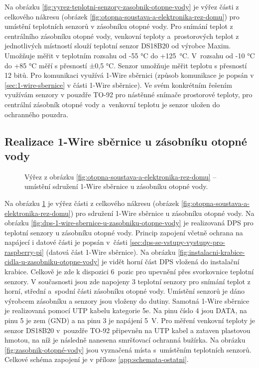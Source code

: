 Na obrázku \ref{fig:vyrez-teplotni-senzory-zasobnik-otopne-vody} je výřez části z celkového nákresu (obrázek \ref{fig:otopna-soustava-a-elektronika-rez-domu}) pro umístění teplotních senzorů v zásobníku otopné vody. Pro snímání teplot z centrálního zásobníku otopné vody, venkovní teploty a~prostorových teplot z jednotlivých místností slouží teplotní senzor DS18B20 \cite{vyrobce-ds18b20} od výrobce Maxim. Umožňuje měřit v teplotním rozsahu od -55 °C do +125~°C. V~rozsahu od -10 °C do +85 °C měří s přesností ±0,5 °C. Senzor umožňuje měřit teplotu s přesností 12 bitů. Pro komunikaci využívá 1-Wire sběrnici (způsob komunikace je popsán v \ref{sec:1-wire-sbernice} v části 1-Wire sběrnice). Ve svém konkrétním řešením využívám senzory v pouzdře TO-92 pro nástěnné snímače prostorové teploty, pro centrální zásobník otopné vody a~venkovní teplotu je senzor uložen do ochranného pouzdra.

\subsection{Realizace 1-Wire sběrnice u zásobníku otopné vody}
\begin{figure}[H]
   \centering
   \def\svgwidth{0.2\columnwidth}
   
   \caption[Výřez pro umístění sdružení 1-Wire sběrnice u zásobníku otopné vody.]{Výřez z obrázku \ref{fig:otopna-soustava-a-elektronika-rez-domu} – umístění sdružení 1-Wire sběrnice u zásobníku otopné vody.}
    \label{fig:vyrez-1-wire-sbernice-u-zasobniku-otopne-vody}
\end{figure}

Na obrázku \ref{fig:vyrez-1-wire-sbernice-u-zasobniku-otopne-vody} je výřez části z celkového nákresu (obrázek \ref{fig:otopna-soustava-a-elektronika-rez-domu}) pro sdružení 1-Wire sběrnice u zásobníku otopné vody. Na obrázku \ref{fig:dps-1-wire-sbernice-u-zasobniku-otopne-vody} je realizovaná DPS pro teplotní senzory u zásobníku otopné vody. Princip zapojení včetně ochrana na napájecí i datové části je popsán v~části \ref{sec:dps-se-vstupy-vystupy-pro-raspberry-pi} (datová část 1-Wire sběrnice). Na obrázku \ref{fig:instalacni-krabice-cidla-u-zasobniku-otopne-vody} je vidět horní část DPS vložená do instalační krabice. Celkově je zde k dispozici 6~pozic pro upevnění přes svorkovnice teplotní senzory. V současnosti jsou zde napojeny 3 teplotní senzory pro snímání teplot z horní, střední a~spodní části zásobníku otopné vody. Umístění senzorů je dáno výrobcem zásobníku a senzory jsou vloženy do dutiny. Samotná 1-Wire sběrnice je realizovaná pomocí UTP kabelu kategorie 5e. Na pinu číslo 4 jsou DATA, na pinu 5 je zem (GND) a na pinu 3 je napájení 5~V. Pro měření venkovní teploty je senzor DS18B20 v~pouzdře TO-92 připevněn na UTP kabel a zataven plastovou hmotou, na níž je následně nanesena smršťovací ochranná bužírka. Na obrázku \ref{fig:zasobnik-otopné-vody} jsou vyznačená místa s~umístěním teplotních senzorů. Celkové schéma zapojení je v příloze \ref{app:schemata-ostatni}.

